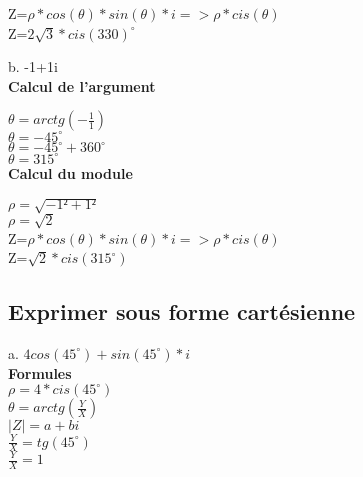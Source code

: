 Z=$\rho * cos(\theta)*sin(\theta)*i => \rho * cis(\theta)$ \\

Z=$ 2\sqrt{3} * cis(330)^{\circ} $ \\

\vspace{5mm} %

b.  -1+1i \\

\textbf{Calcul de l'argument} \\
\vspace{3mm} %

$\theta = arctg(-\frac{1} {1})$ \\
$\theta = -45^{\circ}$ \\
$\theta = -45^{\circ} + 360^{\circ}$ \\
$\theta = 315^{\circ}$ \\

\textbf{Calcul du module} \\
\vspace{3mm} %

$\rho = \sqrt{-1²+1²}$ \\
$\rho = \sqrt{2}$ \\

Z=$\rho * cos(\theta)*sin(\theta)*i => \rho * cis(\theta)$ \\

Z=$ \sqrt{2} * cis(315^{\circ}) $ \\

\newpage

\vspace{3mm} %
\subsection{Exprimer sous forme cartésienne}
\vspace{3mm} %

a. $4cos(45^{\circ}) + sin(45^{\circ}) *i$ \\

\textbf{Formules} \\
$\rho = 4 * cis(45^{\circ})$\\
$\theta = arctg(\frac{Y}{X})$ \\
$|Z| = a+bi $\\

\vspace{3mm} %
$\frac{Y}{X} = tg(45^{\circ})$\\
$\frac{Y}{X} = 1$\\

